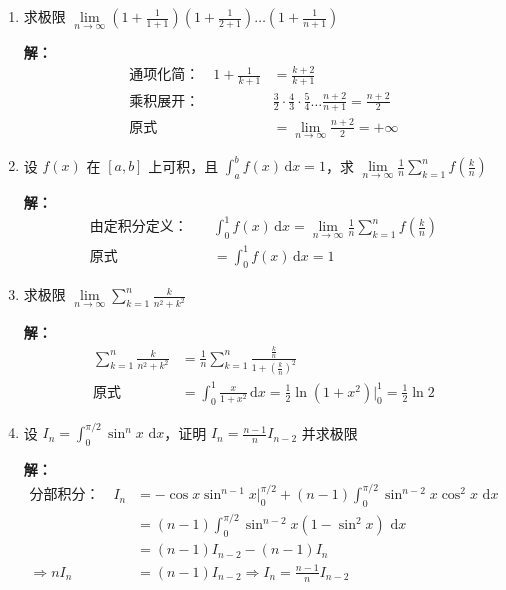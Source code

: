 \documentclass[12pt,a4paper]{article}
\newcommand{\dd}{\,\mathrm{d}}
\newcommand{\Lim}[2]{\lim\limits_{#1 \to #2}}
\begin{document}
\begin{enumerate}[label=\textbf{\arabic*.}, leftmargin=*, itemsep=1.2em]
\item 求极限 $\displaystyle \Lim{n}{\infty} \left( 1 + \frac{1}{1+1} \right) \left( 1 + \frac{1}{2+1} \right) \dots \left( 1 + \frac{1}{n+1} \right)$

\textbf{解：}
\begin{align*}
\text{通项化简：} \quad 1 + \frac{1}{k+1} &= \frac{k+2}{k+1} \\
\text{乘积展开：} \quad & \frac{3}{2} \cdot \frac{4}{3} \cdot \frac{5}{4} \dots \frac{n+2}{n+1} = \frac{n+2}{2} \\
\text{原式} &= \Lim{n}{\infty} \frac{n+2}{2} = +\infty
\end{align*}

\item 设 $f(x)$ 在 $[a,b]$ 上可积，且 $\displaystyle \int_a^b f(x)\dd x = 1$，求 $\displaystyle \Lim{n}{\infty} \frac{1}{n} \sum_{k=1}^n f\left( \frac{k}{n} \right)$

\textbf{解：}
\begin{align*}
\text{由定积分定义：} \quad & \int_0^1 f(x)\dd x = \Lim{n}{\infty} \frac{1}{n} \sum_{k=1}^n f\left( \frac{k}{n} \right) \\
\text{原式} &= \int_0^1 f(x)\dd x = 1
\end{align*}

\item 求极限 $\displaystyle \Lim{n}{\infty} \sum_{k=1}^n \frac{k}{n^2 + k^2}$

\textbf{解：}
\begin{align*}
\sum_{k=1}^n \frac{k}{n^2 + k^2} &= \frac{1}{n} \sum_{k=1}^n \frac{\frac{k}{n}}{1 + \left( \frac{k}{n} \right)^2} \\
\text{原式} &= \int_0^1 \frac{x}{1+x^2} \dd x = \frac{1}{2} \ln(1+x^2) \bigg|_0^1 = \frac{1}{2}\ln 2
\end{align*}

\item 设 $\displaystyle I_n = \int_0^{\pi/2} \sin^n x \, \dd x$，证明 $I_n = \frac{n-1}{n} I_{n-2}$ 并求极限

\textbf{解：}
\begin{align*}
\text{分部积分：} \quad I_n &= -\cos x \sin^{n-1}x \bigg|_0^{\pi/2} + (n-1) \int_0^{\pi/2} \sin^{n-2}x \cos^2x \, \dd x \\
&= (n-1) \int_0^{\pi/2} \sin^{n-2}x (1-\sin^2x) \, \dd x \\
&= (n-1)I_{n-2} - (n-1)I_n \\
\Rightarrow nI_n &= (n-1)I_{n-2} \Rightarrow I_n = \frac{n-1}{n}I_{n-2}
\end{align*}


\end{enumerate}
\end{document}
